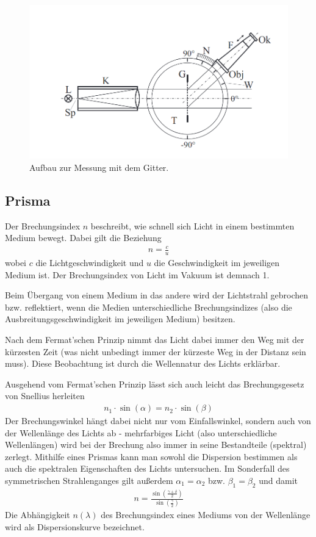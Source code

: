 \documentclass{article}
\begin{document}
\begin{figure}[H]
\centering
\includegraphics[scale=1.5]{gitter.png}
\caption{Aufbau zur Messung mit dem Gitter.}
\label{fig:gitter}
\end{figure}


\subsection{Prisma}
Der Brechungsindex $n$ beschreibt, wie schnell sich Licht in einem bestimmten Medium bewegt. Dabei gilt die Beziehung
\begin{align*}
n = \frac{c}{u}
\end{align*}
wobei $c$ die Lichtgeschwindigkeit und $u$ die Geschwindigkeit im jeweiligen Medium ist. Der Brechungsindex von Licht im Vakuum ist demnach 1.

Beim Übergang von einem Medium in das andere wird der Lichtstrahl gebrochen bzw. reflektiert, wenn die Medien unterschiedliche Brechungsindizes (also die Ausbreitungsgeschwindigkeit im jeweiligen Medium) besitzen.

Nach dem Fermat'schen Prinzip nimmt das Licht dabei immer den Weg mit der kürzesten Zeit (was nicht unbedingt immer der kürzeste Weg in der Distanz sein muss). Diese Beobachtung ist durch die Wellennatur des Lichts erklärbar.

Ausgehend vom Fermat'schen Prinzip lässt sich auch leicht das Brechungsgesetz von Snellius herleiten
\begin{align*}
n_1\cdot\sin(\alpha) = n_2\cdot\sin(\beta)
\end{align*}
Der Brechungswinkel hängt dabei nicht nur vom Einfallswinkel, sondern auch von der Wellenlänge des Lichts ab - mehrfarbiges Licht (also unterschiedliche Wellenlängen) wird bei der Brechung also immer in seine Bestandteile (spektral) zerlegt. Mithilfe eines Prismas kann man sowohl die Dispersion bestimmen als auch die spektralen Eigenschaften des Lichts untersuchen. Im Sonderfall des symmetrischen Strahlenganges gilt außerdem $\alpha_1 = \alpha_2$ bzw. $\beta_1 = \beta_2$ und damit
\begin{align}
\label{eq:brechung}
n = \frac{\sin\left(\frac{\gamma + \delta}{2}\right)}{\sin\left(\frac{\gamma}{2}\right)}
\end{align}
Die Abhängigkeit $n(\lambda)$ des Brechungsindex eines Mediums von der Wellenlänge wird als Dispersionskurve bezeichnet.
\end{document}

